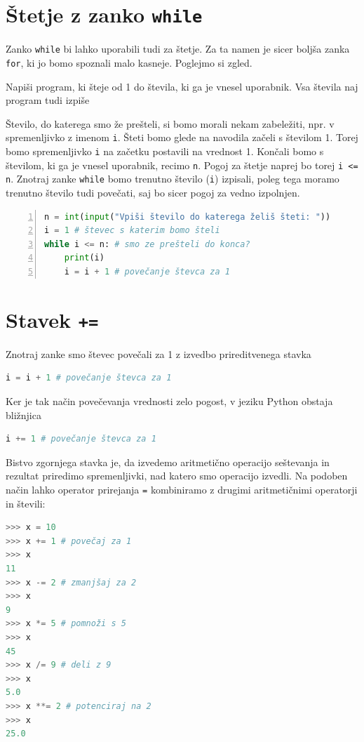 \section{Štetje z zanko \texttt{while}}

Zanko \texttt{while} bi lahko uporabili tudi za štetje. Za ta namen je sicer boljša zanka \texttt{for}, ki jo bomo spoznali malo kasneje. Poglejmo si zgled.
\begin{zgled}
Napiši program, ki šteje od 1 do števila, ki ga je vnesel uporabnik. Vsa števila naj program tudi izpiše
\end{zgled}
\begin{resitev}
Število, do katerega smo že prešteli, si bomo morali nekam zabeležiti, npr. v spremenljivko z imenom \texttt{i}. Šteti bomo glede na navodila začeli s številom 1. Torej bomo spremenljivko \texttt{i} na začetku postavili na vrednost 1. Končali bomo s številom, ki ga je vnesel uporabnik, recimo \texttt{n}. Pogoj za štetje naprej bo torej \texttt{i <= n}. Znotraj zanke \texttt{while} bomo trenutno število (\texttt{i}) izpisali, poleg tega moramo trenutno število tudi povečati, saj bo sicer pogoj za vedno izpolnjen. 
\begin{lstlisting}[language=Python,numbers=left]
n = int(input("Vpiši število do katerega želiš šteti: "))
i = 1 # števec s katerim bomo šteli
while i <= n: # smo ze prešteli do konca?
    print(i)
    i = i + 1 # povečanje števca za 1
\end{lstlisting}
\end{resitev}

\section{Stavek \texttt{+=}}
Znotraj zanke smo števec povečali za 1 z izvedbo prireditvenega stavka
\begin{lstlisting}[language=Python]
i = i + 1 # povečanje števca za 1
\end{lstlisting}
Ker je tak način povečevanja vrednosti zelo pogost, v jeziku Python obstaja bližnjica
\begin{lstlisting}[language=Python]
i += 1 # povečanje števca za 1
\end{lstlisting}
Bistvo zgornjega stavka je, da izvedemo aritmetično operacijo seštevanja in rezultat priredimo spremenljivki, nad katero smo operacijo izvedli. Na podoben način lahko operator prirejanja \texttt{=} kombiniramo z drugimi aritmetičnimi operatorji in števili:
\begin{lstlisting}[language=Python]
>>> x = 10
>>> x += 1 # povečaj za 1
>>> x
11
>>> x -= 2 # zmanjšaj za 2
>>> x
9
>>> x *= 5 # pomnoži s 5
>>> x
45
>>> x /= 9 # deli z 9
>>> x
5.0
>>> x **= 2 # potenciraj na 2
>>> x
25.0
\end{lstlisting}

